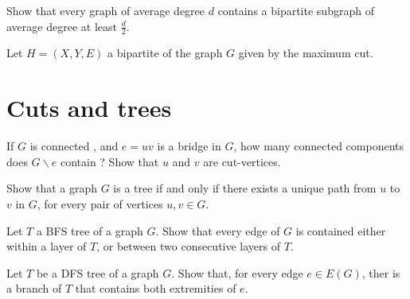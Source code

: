 \documentclass{article}
\theoremstyle{plain}
\begin{document}
  \begin{correction}{}{}

  \end{correction}

  \exercice Show that every graph of average degree $d$ contains a bipartite
  subgraph of average degree at least $\frac d 2$.

  \begin{correction}{}{}
    Let $H = (X, Y, E)$ a bipartite of the graph $G$ given by the maximum cut.
  \end{correction}

  \section{Cuts and trees}

  \exercice If $G$ is connected , and $e=uv$ is a bridge in $G$, how many
  connected components does $G\backslash e$ contain ? Show that $u$ and $v$ are
  cut-vertices.

  \exercice Show that a graph $G$ is a tree if and only if there exists a unique
  path from $u$ to $v$ in $G$, for every pair of vertices $u, v \in G$.

  \exercice Let $T$ a BFS tree of a graph $G$. Show that every edge of $G$ is
  contained either within a layer of $T$, or between two consecutive layers of
  $T$.

  \exercice Let $T$ be a DFS tree of a graph $G$. Show that, for every edge $e
  \in E(G)$, ther is a branch of $T$ that contains both extremities of $e$.
\end{document}
